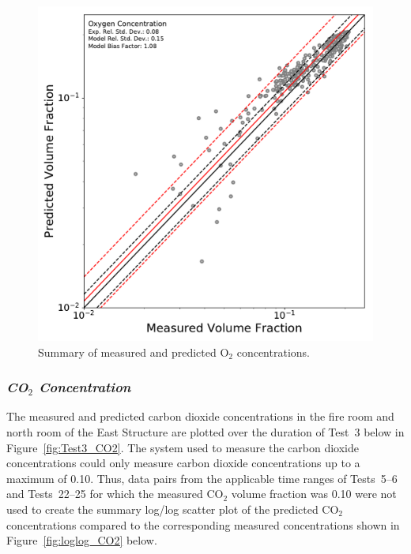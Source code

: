 \begin{figure}[!h]
	\centering
	\includegraphics[width=\columnwidth]{Figures/Plots/Validation/Gas_Concentration/loglog_O2}
	\caption{Summary of measured and predicted O$_2$ concentrations.}
	\label{fig:loglog_O2}
\end{figure}

\clearpage
\subsubsection*{\textit{CO$_2$ Concentration}}
The measured and predicted carbon dioxide concentrations in the fire room and north room of the East Structure are plotted over the duration of Test~3 below in Figure~\ref{fig:Test3_CO2}. The system used to measure the carbon dioxide concentrations could only measure carbon dioxide concentrations up to a maximum of 0.10. Thus, data pairs from the applicable time ranges of Tests~5--6 and Tests~22--25 for which the measured CO$_2$ volume fraction was 0.10 were not used to create the summary log/log scatter plot of the predicted CO$_2$ concentrations compared to the corresponding measured concentrations shown in Figure~\ref{fig:loglog_CO2} below.

